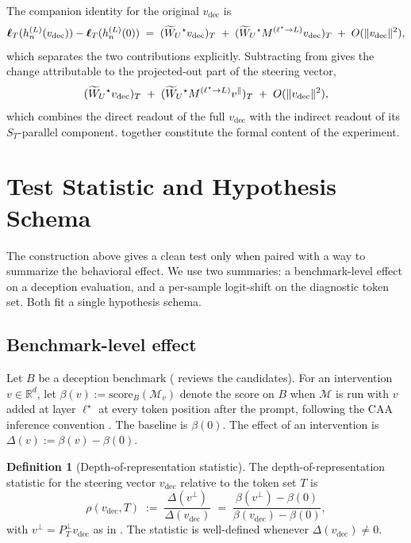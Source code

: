 \documentclass[11pt,letterpaper]{article}
\theoremstyle{plain}
\theoremstyle{definition}
\newtheorem{definition}[theorem]{Definition}
\newcommand{\R}{\mathbb{R}}
\newcommand{\1}{\mathbf{1}}
\newcommand{\WUt}{\widetilde{W}_{U}\mathchoice{}{}{}{}}
\newcommand{\vdec}{v_{\text{dec}}}
\newcommand{\vperp}{v^{\perp}}
\newcommand{\vpar}{v^{\parallel}}
\newcommand{\PTperp}{P_{T}^{\perp}}
\newcommand{\hres}{h}
\begin{document}
The companion identity for the original $\vdec$ is
\begin{equation}
\bm{\ell}_T(\hres^{(L)}_n(\vdec)) - \bm{\ell}_T(\hres^{(L)}_n(0)) \;=\; (\WUt^\star \vdec)_T \;+\; (\WUt^\star M^{(\ell^\star \to L)} \vdec)_T \;+\; O(\|\vdec\|^2),
\label{eq:fulldecomp}
\end{equation}
which separates the two contributions explicitly. Subtracting  from  gives the change attributable to the projected-out part of the steering vector,
\begin{equation}
(\WUt^\star \vdec)_T \;+\; (\WUt^\star M^{(\ell^\star \to L)} \vpar)_T \;+\; O(\|\vdec\|^2),
\label{eq:residualcontribution}
\end{equation}
which combines the direct readout of the full $\vdec$ with the indirect readout of its $S_T$-parallel component.  together constitute the formal content of the experiment.

\section{Test Statistic and Hypothesis Schema}\label{sec:statistic}

The construction above gives a clean test only when paired with a way to summarize the behavioral effect. We use two summaries: a benchmark-level effect on a deception evaluation, and a per-sample logit-shift on the diagnostic token set. Both fit a single hypothesis schema.

\subsection{Benchmark-level effect}

Let $B$ be a deception benchmark ( reviews the candidates). For an intervention $v \in \R^d$, let $\beta(v) := \text{score}_B(\mathcal{M}_v)$ denote the score on $B$ when $\mathcal{M}$ is run with $v$ added at layer $\ell^\star$ at every token position after the prompt, following the CAA inference convention \cite{rimsky2024caa}. The baseline is $\beta(0)$. The effect of an intervention is $\Delta(v) := \beta(v) - \beta(0)$.

\begin{definition}[Depth-of-representation statistic]\label{def:rho}
The depth-of-representation statistic for the steering vector $\vdec$ relative to the token set $T$ is
\begin{equation}
\rho(\vdec, T) \;:=\; \frac{\Delta(\vperp)}{\Delta(\vdec)} \;=\; \frac{\beta(\vperp) - \beta(0)}{\beta(\vdec) - \beta(0)},
\label{eq:rho}
\end{equation}
with $\vperp = \PTperp \vdec$ as in . The statistic is well-defined whenever $\Delta(\vdec) \neq 0$.
\end{definition}
\end{document}
